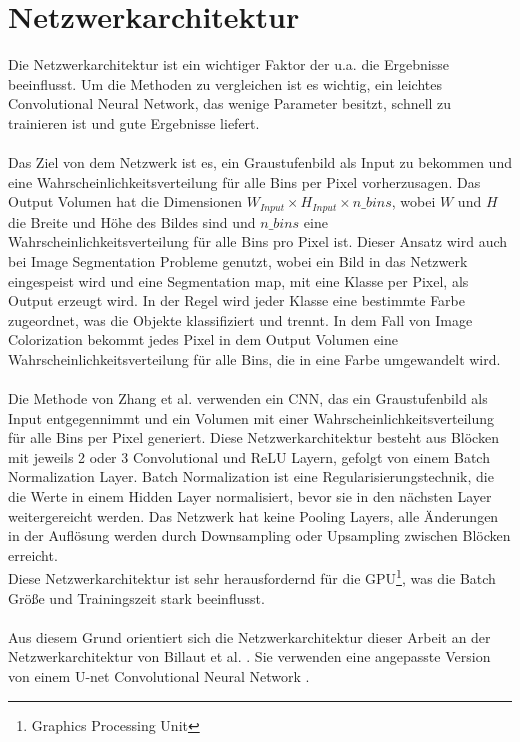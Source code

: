 \section{Netzwerkarchitektur}
Die Netzwerkarchitektur ist ein wichtiger Faktor der u.a. die Ergebnisse beeinflusst. Um die Methoden zu vergleichen ist es wichtig, ein
leichtes Convolutional Neural Network, das wenige Parameter besitzt, schnell zu trainieren ist und gute Ergebnisse liefert. 
\\
\\
Das Ziel von dem Netzwerk ist es, ein Graustufenbild als Input zu bekommen und eine Wahrscheinlichkeitsverteilung für alle Bins per Pixel vorherzusagen.
Das Output Volumen hat die Dimensionen $ W_{Input} \times H_{Input} \times n\_bins $, wobei $W$ und $H$ die Breite und Höhe des Bildes sind und
$n\_bins$ eine Wahrscheinlichkeitsverteilung für alle Bins pro Pixel ist. Dieser Ansatz wird auch bei Image Segmentation Probleme genutzt, wobei ein Bild
in das Netzwerk eingespeist wird und eine Segmentation map, mit eine Klasse per Pixel, als Output erzeugt wird. In der Regel wird jeder Klasse eine
bestimmte Farbe zugeordnet, was die Objekte klassifiziert und trennt. In dem Fall von Image Colorization bekommt jedes Pixel in dem Output Volumen
eine Wahrscheinlichkeitsverteilung für alle Bins, die in eine Farbe umgewandelt wird.
\\
\\
Die Methode von Zhang et al. \cite{zhang2016colorful} verwenden ein \gls{CNN}, das ein Graustufenbild als Input entgegennimmt und ein Volumen mit
einer Wahrscheinlichkeitsverteilung für alle Bins per Pixel generiert. Diese Netzwerkarchitektur besteht aus Blöcken mit jeweils 2 oder 3 Convolutional
und ReLU Layern, gefolgt von einem Batch Normalization Layer. Batch Normalization ist eine Regularisierungstechnik, die die Werte in einem Hidden Layer
normalisiert, bevor sie in den nächsten Layer weitergereicht werden. Das Netzwerk hat keine Pooling Layers, alle Änderungen in der Auflösung werden durch
Downsampling oder Upsampling zwischen Blöcken erreicht.
\\
Diese Netzwerkarchitektur ist sehr herausfordernd für die GPU\footnote{Graphics Processing Unit}, was die Batch Größe und Trainingszeit stark beeinflusst.
\\
\\
Aus diesem Grund orientiert sich die Netzwerkarchitektur dieser Arbeit an der Netzwerkarchitektur von Billaut et al. \cite{billaut2018colorunet}. 
Sie verwenden eine angepasste Version von einem U-net Convolutional Neural Network \cite{ronneberger2015unet}. 

